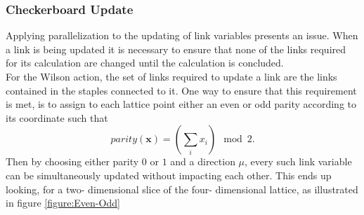 \documentclass[a4paper,10pt]{article}
\begin{document}
\subsubsection{Checkerboard Update}\label{sec:Checkerboard_Update}
Applying parallelization to the updating of link variables presents an issue. When a link is being updated it is necessary to ensure that none of the links required for its calculation are changed until the calculation is concluded.\\For the Wilson action, the set of links required to update a link are the links contained in the staples connected to it. One way to ensure that this requirement is met, is to assign to each lattice point either an even or odd parity according to its coordinate
such that 
\begin{equation}
parity(\mathbf{x}) = \left( \sum\limits_i x_i \right) \mod 2.
\end{equation}
Then by choosing either parity $0$ or $1$ and a direction $\mu$, every such link variable can be simultaneously updated without impacting each other. This ends up looking, for a two- dimensional slice of the four- dimensional lattice, as illustrated in figure \ref{figure:Even-Odd}
\end{document}
